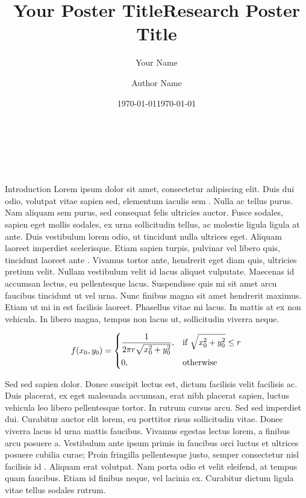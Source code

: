 \documentclass[final]{beamer}
\title{Your Poster Title}
\author{Your Name}
\date{\today}
\title{Research Poster Title}
\author{Author Name}
\institute{University of Southern California}
\date{\today}
\begin{document}
\begin{frame}[t]

\begin{center}

    \Huge \garamondfont\textbf{\inserttitle}\\[-8pt]
    
    \huge \insertauthor\\[-7pt]
    
    \normalsize \insertdate
    
\end{center}

\begin{columns}[t]

\begin{column}{.30\textwidth}
\begin{block}{Introduction}
    Lorem ipsum dolor sit amet, consectetur adipiscing elit. Duis dui odio, volutpat vitae sapien sed, elementum iaculis sem \cite{lee_cross-sectional_2017}. Nulla ac tellus purus. Nam aliquam sem purus, sed consequat felis ultricies auctor. Fusce sodales, sapien eget mollis sodales, ex urna sollicitudin tellus, ac molestie ligula ligula at ante. Duis vestibulum lorem odio, ut tincidunt nulla ultrices eget. Aliquam laoreet imperdiet scelerisque. Etiam sapien turpis, pulvinar vel libero quis, tincidunt laoreet ante \cite{jackson_estimation_2015}. Vivamus tortor ante, hendrerit eget diam quis, ultricies pretium velit. Nullam vestibulum velit id lacus aliquet vulputate. Maecenas id accumsan lectus, eu pellentesque lacus. Suspendisse quis mi sit amet arcu faucibus tincidunt ut vel urna. Nunc finibus magna sit amet hendrerit maximus. Etiam ut mi in est facilisis laoreet. Phasellus vitae mi lacus. In mattis at ex non vehicula. In libero magna, tempus non lacus ut, sollicitudin viverra neque.

    \begin{equation} \label{fig:sample_equation}
        f(x_{0},y_{0}) = 
        \begin{dcases}
            \frac{1}{2\pi r\sqrt{x_{0}^{2}+y_{0}^{2}}}, & \text{if } \sqrt{x_{0}^2 + y_{0}^2} \leq r\\
            0, & \text{otherwise}
        \end{dcases}
    \end{equation}

    Sed sed sapien dolor. Donec suscipit lectus est, dictum facilisis velit facilisis ac. Duis placerat, ex eget malesuada accumsan, erat nibh placerat sapien, luctus vehicula leo libero pellentesque tortor. In rutrum cursus arcu. Sed sed imperdiet dui. Curabitur auctor elit lorem, eu porttitor risus sollicitudin vitae. Donec viverra lacus id urna mattis faucibus. Vivamus egestas lectus lorem, a finibus arcu posuere a. Vestibulum ante ipsum primis in faucibus orci luctus et ultrices posuere cubilia curae; Proin fringilla pellentesque justo, semper consectetur nisl facilisis id \cite{stones_access_2018}. Aliquam erat volutpat. Nam porta odio et velit eleifend, at tempus quam faucibus. Etiam id finibus neque, vel lacinia ex. Curabitur dictum ligula vitae tellus sodales rutrum.


\end{block}
\end{column}
\end{columns}
\end{frame}
\end{document}
